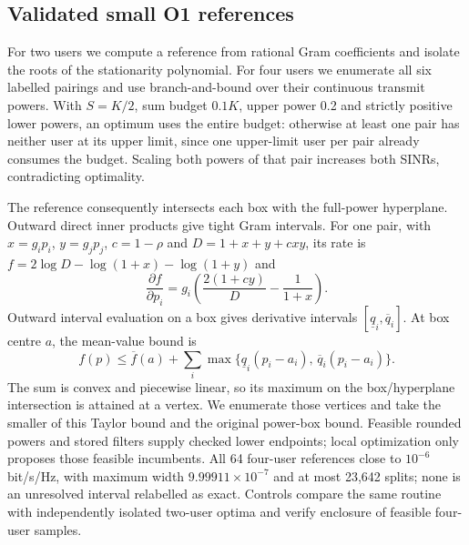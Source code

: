 

\subsection*{Validated small O1 references}
For two users we compute a reference from rational Gram coefficients and isolate the roots of the stationarity polynomial. For four users we enumerate all six labelled pairings and use branch-and-bound over their continuous transmit powers. With \(S=K/2\), sum budget \(0.1K\), upper power 0.2 and strictly positive lower powers, an optimum uses the entire budget: otherwise at least one pair has neither user at its upper limit, since one upper-limit user per pair already consumes the budget. Scaling both powers of that pair increases both SINRs, contradicting optimality.

The reference consequently intersects each box with the full-power hyperplane. Outward direct inner products give tight Gram intervals. For one pair, with \(x=g_i p_i\), \(y=g_j p_j\), \(c=1-\rho\) and \(D=1+x+y+cxy\), its rate is \(f=2\log D-\log(1+x)-\log(1+y)\) and
\[
\frac{\partial f}{\partial p_i}
=g_i\left(\frac{2(1+cy)}{D}-\frac{1}{1+x}\right).
\]
Outward interval evaluation on a box gives derivative intervals \([\underline q_i,\overline q_i]\). At box centre \(a\), the mean-value bound is
\[
f(p)\leq \overline f(a)+
\sum_i\max\{\underline q_i(p_i-a_i),\,\overline q_i(p_i-a_i)\}.
\]
The sum is convex and piecewise linear, so its maximum on the box/hyperplane intersection is attained at a vertex. We enumerate those vertices and take the smaller of this Taylor bound and the original power-box bound. Feasible rounded powers and stored filters supply checked lower endpoints; local optimization only proposes those feasible incumbents. All 64 four-user references close to \(10^{-6}\) bit/s/Hz, with maximum width \(9.99911\times10^{-7}\) and at most 23,642 splits; none is an unresolved interval relabelled as exact. Controls compare the same routine with independently isolated two-user optima and verify enclosure of feasible four-user samples.



